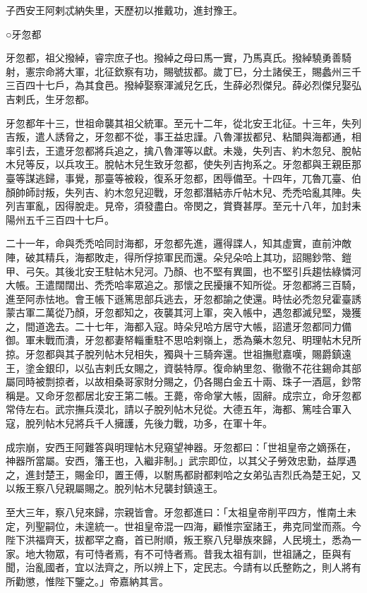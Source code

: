 \begin{pinyinscope}
 子西安王阿剌忒納失里，天歷初以推戴功，進封豫王。



 ○牙忽都



 牙忽都，祖父撥綽，睿宗庶子也。撥綽之母曰馬一實，乃馬真氏。撥綽驍勇善騎射，憲宗命將大軍，北征欽察有功，賜號拔都。歲丁巳，分土諸侯王，賜蠡州三千三百四十七戶，為其食邑。撥綽娶察渾滅兒乞氏，生薛必烈傑兒。薛必烈傑兒娶弘吉剌氏，生牙忽都。



 牙忽都年十三，世祖命襲其祖父統軍。至元十二年，從北安王北征。十三年，失列吉叛，遣人誘脅之，牙忽都不從，事王益忠謹。八魯渾拔都兒、粘闓與海都通，相率引去，王遣牙忽都將兵追之，擒八魯渾等以獻。未幾，失列吉、約木忽兒、脫帖木兒等反，以兵攻王。脫帖木兒生致牙忽都，使失列吉拘系之。牙忽都與王親臣那臺等謀逃歸，事覺，那臺等被殺，復系牙忽都，困辱備至。十四年，兀魯兀臺、伯顏帥師討叛，失列吉、約木忽兒迎戰，牙忽都潛結赤斤帖木兒、禿禿哈亂其陣。失列吉軍亂，因得脫走。見帝，須發盡白。帝閔之，賞賚甚厚。至元十八年，加封耒陽州五千三百四十七戶。



 二十一年，命與禿禿哈同討海都，牙忽都先進，邏得諜人，知其虛實，直前沖敵陣，破其精兵，海都敗走，得所俘掠軍民而還。朵兒朵哈上其功，詔賜鈔幣、鎧甲、弓矢。其後北安王駐帖木兒河。乃顏、也不堅有異圖，也不堅引兵趨怯綠憐河大帳。王遣闊闊出、禿禿哈率眾追之。那懷之民擾攘不知所從。牙忽都將三百騎，進至阿赤怯地。會王帳下遜篤思部兵逃去，牙忽都諭之使還。時怯必禿忽兒霍臺誘蒙古軍二萬從乃顏，牙忽都知之，夜襲其河上軍，突入帳中，遇忽都滅兒堅，幾獲之，間道逸去。二十七年，海都入寇。時朵兒哈方居守大帳，詔遣牙忽都同力備御。軍未戰而潰，牙忽都妻帑輜重駐不思哈剌嶺上，悉為藥木忽兒、明理帖木兒所掠。牙忽都與其子脫列帖木兒相失，獨與十三騎奔還。世祖撫慰嘉嘆，賜爵鎮遠王，塗金銀印，以弘吉剌氏女賜之，資裝特厚。復命納里忽、徹徹不花往錫命其部屬同時被剽掠者，以故相桑哥家財分賜之，仍各賜白金五十兩、珠子一酒扈，鈔幣稱是。又命牙忽都居北安王第二帳。王薨，帝命掌大帳，固辭。成宗立，命牙忽都常侍左右。武宗撫兵漠北，請以子脫列帖木兒從。大德五年，海都、篤哇合軍入寇，脫列帖木兒將兵千人擁護，先後力戰，功多，在軍十年。



 成宗崩，安西王阿難答與明理帖木兒窺望神器。牙忽都曰：「世祖皇帝之嫡孫在，神器所當屬。安西，籓王也，入繼非制。」武宗即位，以其父子勞效忠勤，益厚遇之，進封楚王，賜金印，置王傅，以駙馬都尉都剌哈之女弟弘吉烈氏為楚王妃，又以叛王察八兒親屬賜之。脫列帖木兒襲封鎮遠王。



 至大三年，察八兒來歸，宗親皆會。牙忽都進曰：「太祖皇帝削平四方，惟南土未定，列聖嗣位，未遑統一。世祖皇帝混一四海，顧惟宗室諸王，弗克同堂而燕。今陛下洪福齊天，拔都罕之裔，首已附順，叛王察八兒舉族來歸，人民境土，悉為一家。地大物眾，有可恃者焉，有不可恃者焉。昔我太祖有訓，世祖誦之，臣與有聞，治亂國者，宜以法齊之，所以辨上下，定民志。今請有以氏整飭之，則人將有所勸懲，惟陛下鑒之。」帝嘉納其言。




\end{pinyinscope}
